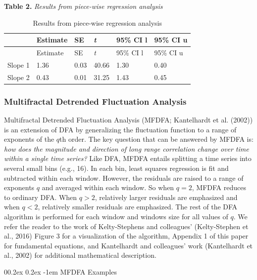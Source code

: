 \documentclass[
  man]{apa6}
\makeatletter
\let\oldparagraph\paragraph
\renewcommand{\paragraph}[1]{\oldparagraph{#1}\mbox{}}
\renewcommand{\paragraph}{\@startsection{paragraph}{4}{\parindent}%
  {0\baselineskip \@plus 0.2ex \@minus 0.2ex}%
  {-1em}%
  {\normalfont\normalsize\bfseries\itshape\typesectitle}}
\makeatother
\begin{document}
\textbf{Table 2.} \emph{Results from piece-wise regression analysis}

\begin{longtable}[]{@{}llllll@{}}
\caption{Results from piece-wise regression analysis}\tabularnewline
\toprule\noalign{}
& Estimate & SE & \emph{t} & 95\% CI l & 95\% CI u \\
\midrule\noalign{}
\endfirsthead
\toprule\noalign{}
& Estimate & SE & \emph{t} & 95\% CI l & 95\% CI u \\
\midrule\noalign{}
\endhead
\bottomrule\noalign{}
\endlastfoot
Slope 1 & 1.36 & 0.03 & 40.66 & 1.30 & 0.40 \\
Slope 2 & 0.43 & 0.01 & 31.25 & 1.43 & 0.45 \\
\end{longtable}

\hypertarget{multifractal-detrended-fluctuation-analysis}{%
\subsubsection{Multifractal Detrended Fluctuation Analysis}\label{multifractal-detrended-fluctuation-analysis}}

Multifractal Detrended Fluctuation Analysis (MFDFA;
Kantelhardt et al. (2002)) is an extension of DFA
by generalizing the fluctuation function to a range of exponents of the
\(q\)th order. The key question that can be answered by MFDFA is: \emph{how
does the magnitude and direction of long range correlation change over
time within a single time series?} Like DFA, MFDFA entails splitting a
time series into several small bins (e.g., 16). In each bin, least
squares regression is fit and subtracted within each window. However,
the residuals are raised to a range of exponents \(q\) and averaged within
each window. So when \(q = 2\), MFDFA reduces to ordinary DFA. When
\(q >2\), relatively larger residuals are emphasized and when \(q < 2\),
relatively smaller residuals are emphasized. The rest of the DFA
algorithm is performed for each window and windows size for all values
of \(q\). We refer the reader to the work of Kelty-Stephens and
colleagues' (Kelty-Stephen et al., 2016) Figure
3 for a visualization of the algorithm, Appendix 1 of this paper for
fundamental equations, and Kantelhardt and colleagues' work
(Kantelhardt et al., 2002) for additional
mathematical description.

\hypertarget{mfdfa-examples}{%
\paragraph{MFDFA Examples}\label{mfdfa-examples}}
\end{document}
